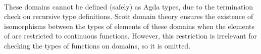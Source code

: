 \begin{AgdaAlign}
\begin{code}
\>[32]\<%
\\
%
\>[4]\AgdaSymbol{(}\AgdaSpace{}%
%
\>[16]\AgdaSymbol{:}\AgdaSpace{}%
\AgdaSpace{}%
\AgdaSymbol{)}%
\>[32]\<%
\end{code}
%
These domains cannot be defined (safely) as Agda types,
due to the termination check on recursive type definitions.
Scott domain theory ensures the existence of isomorphisms between the types of elements of these domains
when the elements of  are restricted to continuous functions.
However, this restriction is irrelevant for checking the types of functions on domains,
so it is omitted.
%
\begin{code}%
%
\>[4]\AgdaSymbol{\{\{}\AgdaSpace{}%
%
\>[16]\AgdaSymbol{:}\AgdaSpace{}%
\AgdaSpace{}%
\AgdaSpace{}%
%
\>[32]%
\>[35]\AgdaSpace{}%
\AgdaSpace{}%
\AgdaSpace{}%
\AgdaSpace{}%
%
\>[62]\AgdaSymbol{\}\}}\<%
\\
%
\>[4]\AgdaSymbol{\{\{}\AgdaSpace{}%
%
\>[16]\AgdaSymbol{:}\AgdaSpace{}%
\AgdaSpace{}%
\AgdaSpace{}%
%
\>[32]%
\>[35]\AgdaSymbol{(}\AgdaSpace{}%
\AgdaSpace{}%
\AgdaSpace{}%
\AgdaSpace{}%
\AgdaSpace{}%
\AgdaSpace{}%
\AgdaSpace{}%
\AgdaSpace{}%
\AgdaSymbol{)}%
\>[62]\AgdaSymbol{\}\}}\<%
\\
%
\>[4]\AgdaSymbol{\{\{}\AgdaSpace{}%
%
\>[16]\AgdaSymbol{:}\AgdaSpace{}%
\AgdaSpace{}%
\AgdaSpace{}%
%
\>[32]%
\>[35]\AgdaSymbol{(}\AgdaSpace{}%
\AgdaSpace{}%
\AgdaSpace{}%
\AgdaSpace{}%
\AgdaSpace{}%
\AgdaSpace{}%

\end{code}
\end{AgdaAlign}
